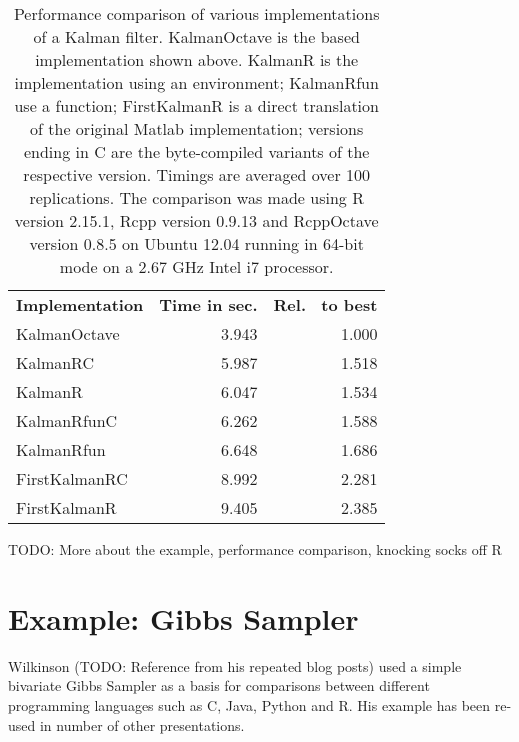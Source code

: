 \begin{table}[hbt]
  \begin{center}
    \begin{small}
      \begin{tabular}{lrr}
        \toprule
        {\bf Implementation \phantom{XX}} & {\bf Time in sec.} & {\bf Rel.~ to best} \\
        \cmidrule(r){1-3}
         KalmanOctave  & 3.943 & 1.000 \\
             KalmanRC  & 5.987 & 1.518 \\
              KalmanR  & 6.047 & 1.534 \\
          KalmanRfunC  & 6.262 & 1.588 \\
           KalmanRfun  & 6.648 & 1.686 \\
        FirstKalmanRC  & 8.992 & 2.281 \\
         FirstKalmanR  & 9.405 & 2.385 \\
        \bottomrule
      \end{tabular}
      \caption{Performance comparison of various implementations of a Kalman filter.
        KalmanOctave is the  based implementation shown above.
        KalmanR is the \R implementation using an environment; KalmanRfun use a
        function; FirstKalmanR is a direct translation of the original Matlab
        implementation; versions ending in C are the byte-compiled variants of
        the respective version.  Timings are averaged over 100 replications.
        The comparison was made using R version 2.15.1, Rcpp version 0.9.13 and
        RcppOctave version 0.8.5 on Ubuntu 12.04 running in 64-bit mode on a
        2.67 GHz Intel i7 processor.}
      \label{tab:benchmark}
    \end{small}
  \end{center}
\end{table}


TODO: More about the example, performance comparison, knocking socks off R


\section{Example: Gibbs Sampler}

Wilkinson (TODO: Reference from his repeated blog posts) used a simple
bivariate Gibbs Sampler as a basis for comparisons between different
programming languages such as C, Java, Python and R. His example has been
re-used in number of other presentations.

